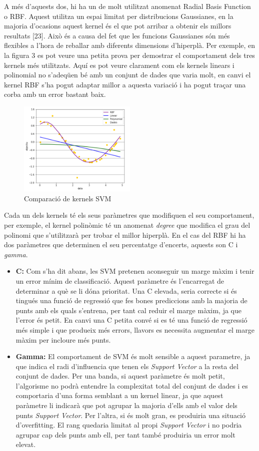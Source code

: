 \documentclass[10pt,a4paper,twocolumn,twoside]{article}
\begin{document}
A més d'aquests dos, hi ha un de molt utilitzat anomenat Radial Basis Function o RBF. Aquest utilitza un espai limitat per distribucions Gaussianes, en la majoria d'ocasions aquest kernel és el que pot arribar a obtenir els millors resultats [23]. Això és a causa del fet que les funcions Gaussianes són més flexibles a l'hora de reballar amb diferents dimensions d'hiperplà. Per exemple, en la figura 3 es pot veure una petita prova per demostrar el comportament dels tres kernels més utilitzats. Aquí es pot veure clarament com els kernels linears i polinomial no s'adeqüen bé amb un conjunt de dades que varia molt, en canvi el kernel RBF s'ha pogut adaptar millor a aquesta variació i ha pogut traçar una corba amb un error bastant baix.
\begin{figure}[!h]
\centering
	\includegraphics[width=0.5\textwidth]{../img/KernelsSVM}
	\caption{Comparació de kernels SVM}
	\label{fig-KernelsSVM}
\end{figure}

Cada un dels kernels té els seus paràmetres que modifiquen el seu comportament, per exemple, el kernel polinòmic té un anomenat \textit{degree} que modifica el grau del polinomi que s'utilitzarà per trobar el millor hiperplà. En el cas del RBF hi ha dos paràmetres que determinen el seu percentatge d'encerts, aquests son C i \textit{gamma}.
\begin{itemize}
\item \textbf{C:} Com s'ha dit abans, les SVM pretenen aconseguir un marge màxim i tenir un error mínim de classificació. Aquest paràmetre és l'encarregat de determinar a què se li dóna prioritat. Una C elevada, seria correcte si és tingués una funció de regressió que fes bones prediccions amb la majoria de punts amb els quals s'entrena, per tant cal reduir el marge màxim, ja que l'error és petit. En canvi una C petita convé si es té una funció de regressió més simple i que produeix més errors, llavors es necessita augmentar el marge màxim per incloure més punts.
\item \textbf{Gamma:} El comportament de SVM és molt sensible a aquest parametre, ja que indica el radi d'influencia que tenen els \textit{Support Vector} a la resta del conjunt de dades. Per una banda, si aquest paràmetre és molt petit, l'algorisme no podrà entendre la complexitat total del conjunt de dades i es comportaria d'una forma semblant a un kernel linear, ja que aquest paràmetre li indicarà que pot agrupar la majoria d'ells amb el valor dels punts \textit{Support Vector}. Per l'altra, si és molt gran, es produiria una situació d'overfitting. El rang quedaria limitat al propi \textit{Support Vector} i no podria agrupar cap dels punts amb ell, per tant també produiria un error molt elevat.
\end{itemize}
\end{document}
